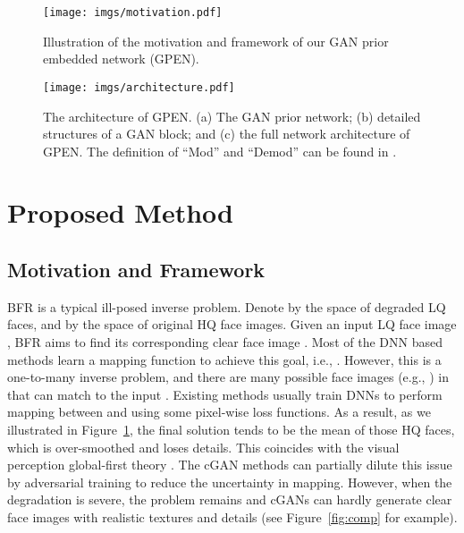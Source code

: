 \documentclass[final]{cvpr}
\begin{document}
\begin{figure}[t!]
\centering
\texttt{[image: imgs/motivation.pdf]}
\caption{Illustration of the motivation and framework of our GAN prior embedded network (GPEN).}
\label{fig:motivation}
\vspace*{-3mm}
\end{figure}

\begin{figure*}[t!]
\centering
\texttt{[image: imgs/architecture.pdf]}
\caption{The architecture of GPEN. (a) The GAN prior network; (b) detailed structures of a GAN block; and (c) the full network architecture of GPEN. The definition of ``Mod'' and ``Demod'' can be found in \cite{Karras2019StyleGAN2}.}
\label{fig:arch}
\vspace*{-3mm}
\end{figure*}

\section{Proposed Method}
\label{sec:proposed}


\subsection{Motivation and Framework}
\label{sec:motivation}
BFR is a typical ill-posed inverse problem. Denote by  the space of degraded LQ faces, and by  the space of original HQ face images. Given an input LQ face image , BFR aims to find its corresponding clear face image . Most of the DNN based methods learn a mapping function  to achieve this goal, i.e., . However, this is a one-to-many inverse problem, and there are many possible face images (e.g., ) in  that can match to the input . Existing methods \cite{Bulat2018SuperFAN,Li2018GFRNet,Dogan2019Exemplar} usually train DNNs to perform mapping between  and  using some pixel-wise loss functions. As a result, as we illustrated in Figure~\ref{fig:motivation}, the final solution  tends to be the mean of those HQ faces, which is over-smoothed and loses details. This coincides with the visual perception global-first theory \cite{Chen2005Global}. The cGAN methods \cite{Isola2017Pix2Pix,Wang2018Pix2PixHD} can partially dilute this issue by adversarial training to reduce the uncertainty in mapping. However, when the degradation is severe, the problem remains and cGANs can hardly generate clear face images with realistic textures and details (see Figure~\ref{fig:comp} for example).
\end{document}
